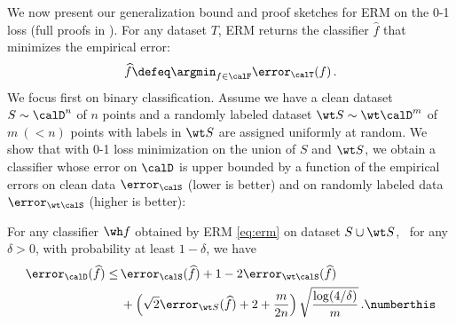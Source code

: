 We now present our generalization bound 
and proof sketches 
for ERM on the 0-1 loss
(full proofs in ).
For any dataset $T$, 
ERM returns the classifier $\widehat f$
that minimizes the empirical error:
\begin{align}
    \widehat f \defeq \argmin_{f\in \calF} \error_\calT(f) \,. \label{eq:erm}
\end{align}
% 
We focus first on
binary classification.  
Assume we have a clean dataset 
$S \sim \calD^n$ of $n$ points
and a randomly labeled dataset 
$\wt S \sim \wt \calD^m$ of $m~(<n)$ points with
labels in $\wt S$ are assigned uniformly at random.
We show that with 0-1 loss minimization 
on the union of $S$ and $\wt S$,
we obtain a classifier 
whose error on $\calD$
is upper bounded 
by a function of the empirical errors 
on clean data $\error_\calS$
(lower is better)
and on randomly labeled data 
$\error_{\wt \calS}$ 
(higher is better): 
\begin{theorem} \label{thm:error_ERM}
    For any classifier $\wh f$ obtained by ERM \eqref{eq:erm} on dataset $S \cup \wt S$,~ 
    for any $\delta > 0$, 
    with probability at least $1-\delta$, 
    we have  
    \begin{align*}
        \error_\calD(\widehat f)  \le \, & \error_\calS(\widehat f) + 1 - 2 \error_{\wt\calS}(\widehat f) \\
        & + \left(\sqrt{2} \error_{\wt S}(\widehat f)   + 2 + \frac{m}{2n}\right) \sqrt{\frac{\log(4/\delta)}{m}} \,. \label{eq:thm1} \numberthis
    \end{align*}
\end{theorem}
% 
% 
